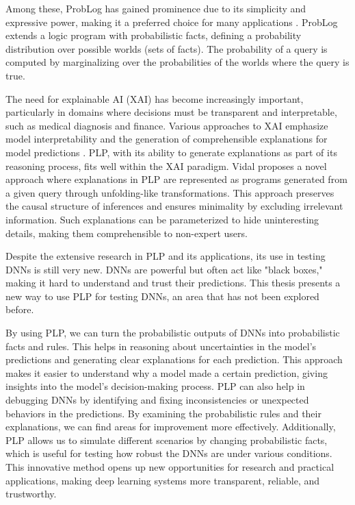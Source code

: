 Among these, ProbLog has gained prominence due to its simplicity and expressive power, making it a preferred choice for many applications \cite{Kimmig2011}. ProbLog extends a logic program with probabilistic facts, defining a probability distribution over possible worlds (sets of facts). The probability of a query is computed by marginalizing over the probabilities of the worlds where the query is true.

The need for explainable AI (XAI) has become increasingly important, particularly in domains where decisions must be transparent and interpretable, such as medical diagnosis and finance. Various approaches to XAI emphasize model interpretability and the generation of comprehensible explanations for model predictions \cite{Arrieta2020}. PLP, with its ability to generate explanations as part of its reasoning process, fits well within the XAI paradigm. Vidal \cite{Vidal2023} proposes a novel approach where explanations in PLP are represented as programs generated from a given query through unfolding-like transformations. This approach preserves the causal structure of inferences and ensures minimality by excluding irrelevant information. Such explanations can be parameterized to hide uninteresting details, making them comprehensible to non-expert users.


Despite the extensive research in PLP and its applications, its use in testing DNNs is still very new. DNNs are powerful but often act like "black boxes," making it hard to understand and trust their predictions. This thesis presents a new way to use PLP for testing DNNs, an area that has not been explored before.

By using PLP, we can turn the probabilistic outputs  of DNNs into probabilistic facts and rules. This helps in reasoning about uncertainties in the model's predictions and generating clear explanations for each prediction. This approach makes it easier to understand why a model made a certain prediction, giving insights into the model’s decision-making process. PLP can also help in debugging DNNs by identifying and fixing inconsistencies or unexpected behaviors in the predictions. By examining the probabilistic rules and their explanations, we can find areas for improvement more effectively. Additionally, PLP allows us to simulate different scenarios by changing probabilistic facts, which is useful for testing how robust the DNNs are under various conditions. This innovative method opens up new opportunities for research and practical applications, making deep learning systems more transparent, reliable, and trustworthy.

